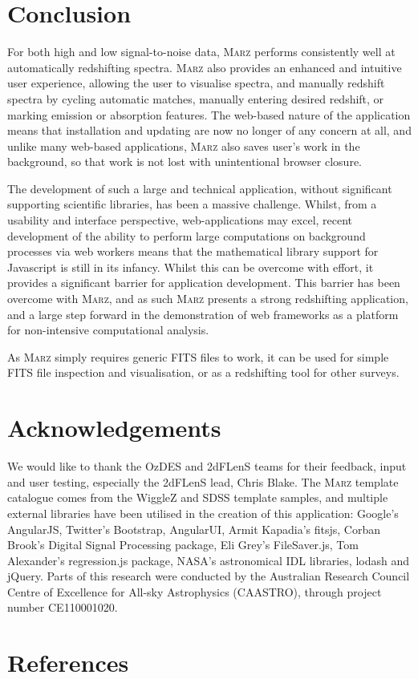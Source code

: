 \documentclass[5p]{elsarticle}
\newcommand{\marz}{\textsc{Marz}}
\begin{document}
\section{Conclusion} \label{sec:conclusion}
For both high and low signal-to-noise data, \marz{} performs consistently well at automatically redshifting spectra. \marz{} also provides an enhanced and intuitive user experience, allowing the user to visualise spectra, and manually redshift spectra by cycling automatic matches, manually entering desired redshift, or marking emission or absorption features. The web-based nature of the application means that installation and updating are now no longer of any concern at all, and unlike many web-based applications, \marz{} also saves user's work in the background, so that work is not lost with unintentional browser closure.

The development of such a large and technical application, without significant supporting scientific libraries, has been a massive challenge. Whilst, from a usability and interface perspective, web-applications may excel, recent development of the ability to perform large computations on background processes via web workers means that the mathematical library support for Javascript is still in its infancy. Whilst this can be overcome with effort, it provides a significant barrier for application development. This barrier has been overcome with \marz{}, and as such \marz{} presents a strong redshifting application, and a large step forward in the demonstration of web frameworks as a platform for non-intensive computational analysis.

As \marz{} simply requires generic FITS files to work, it can be used for simple FITS file inspection and visualisation, or as a redshifting tool for other surveys.

\section*{Acknowledgements}
We would like to thank the OzDES and 2dFLenS teams for their feedback, input and user testing, especially the 2dFLenS lead, Chris Blake. The \marz{} template catalogue comes from the WiggleZ and SDSS template samples, and multiple external libraries have been utilised in the creation of this application: Google's AngularJS, Twitter's Bootstrap, AngularUI, Armit Kapadia's fitsjs, Corban Brook's Digital Signal Processing package, Eli Grey's FileSaver.js, Tom Alexander's regression.js package, NASA's astronomical IDL libraries, lodash and jQuery. Parts of this research were conducted by the Australian Research Council Centre of Excellence for All-sky Astrophysics (CAASTRO), through project number CE110001020.

\newpage 
\section*{References}


%
%
\end{document}
